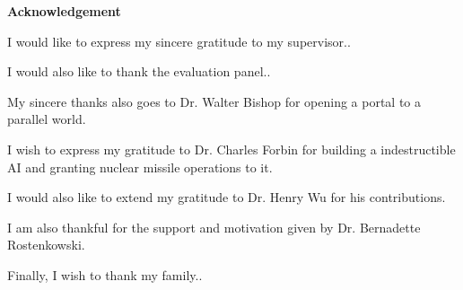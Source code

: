 \begin{center}
\textbf{\Large{Acknowledgement}}
\end{center}
\vspace{0.7cm}
\par
I would like to express my sincere gratitude to my supervisor.. 

I would also like to thank the evaluation panel.. 

My sincere thanks also goes to Dr. Walter Bishop for opening a portal to a parallel world.

I wish to express my gratitude to Dr. Charles Forbin for building a indestructible AI and granting nuclear missile operations to it.

I would also like to extend my gratitude to Dr. Henry Wu for his contributions.  

I am also thankful for the support and motivation given by Dr. Bernadette Rostenkowski.

Finally, I wish to thank my family..